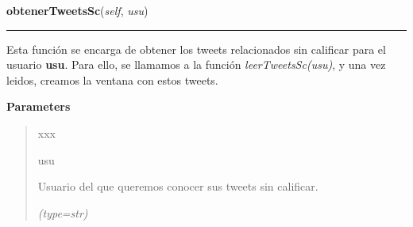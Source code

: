 \hspace{.8\funcindent}\begin{boxedminipage}{\funcwidth}

    \raggedright \textbf{obtenerTweetsSc}(\textit{self}, \textit{usu})

    \vspace{-1.5ex}

    \rule{\textwidth}{0.5\fboxrule}
\setlength{\parskip}{2ex}
    Esta función se encarga de obtener los tweets relacionados sin 
    calificar para el usuario \textbf{usu}. Para ello, se llamamos a la 
    función \textit{leerTweetsSc(usu)}, y una vez leidos, creamos la 
    ventana con estos tweets.

\setlength{\parskip}{1ex}
      \textbf{Parameters}
      \vspace{-1ex}

      \begin{quote}
        \begin{Ventry}{xxx}

          \item[usu]

          Usuario del que queremos conocer sus tweets sin calificar.

            {\it (type=str)}

        \end{Ventry}

      \end{quote}

    \end{boxedminipage}

    \label{funcionesTwitter:FuncionesTwitter:leerTweetsSc}

    \vspace{0.5ex}

